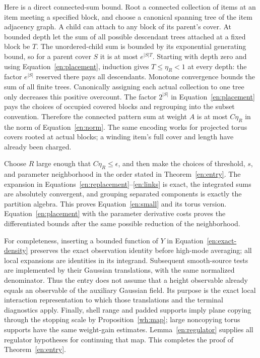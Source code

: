 Here is a direct connected-sum bound.  Root a connected collection
of items at an item meeting a specified block, and choose a canonical
spanning tree of the item adjacency graph.  A child can attach to any
block of its parent's cover.  At bounded depth let the sum of all
possible descendant trees attached at a fixed block be $T$.  The
unordered-child sum is bounded by its exponential generating bound,
so for a parent cover $S$ it is at most $e^{|S|T}$.  Starting with
depth zero and using Equation~\eqref{en:placement}, induction gives
$T\leq\eta_R<1$ at every depth: the factor $e^{|S|}$ reserved there
pays all descendants.  Monotone convergence bounds the sum of all
finite trees.  Canonically assigning each actual collection to one
tree only decreases this positive overcount.  The factor $2^{|S|}$
in Equation~\eqref{en:placement} pays the choices of occupied covered
blocks and regrouping into the subset convention.  Therefore the
connected pattern sum at weight $A$ is at most $C\eta_R$ in the norm
of Equation~\eqref{en:norm}.  The same encoding works for projected
torus covers rooted at actual blocks; a winding item's full cover and
length have already been charged.

Choose $R$ large enough that $C\eta_R\leq\epsilon$, and then make
the choices of threshold, $s$, and parameter neighborhood in the order
stated in Theorem~\ref{en:entry}.  The expansion in
Equations~\eqref{en:replacement}--\eqref{en:links} is exact, the
integrated sums are absolutely convergent, and grouping separated
components is exactly the partition algebra.  This proves
Equation~\eqref{en:small} and its torus version.  Equation~\eqref{en:placement}
with the parameter derivative costs proves the differentiated bounds
after the same possible reduction of the neighborhood.

For completeness, inserting a bounded function of $Y$ in
Equation~\eqref{en:exact-density} preserves the exact observation
identity before high-mode averaging; all local expansions are identities
in its integrand.  Subsequent smooth-source tests are implemented by
their Gaussian translations, with the same normalized denominator.
Thus the entry does not assume that a height observable already equals
an observable of the auxiliary Gaussian field.  Its purpose is the
exact local interaction representation to which those translations
and the terminal diagnostics apply.  Finally, shell range and padded
supports imply plane copying through the stopping scale by
Proposition~\ref{wh:map}; large noncopying torus supports have the same
weight-gain estimates.  Lemma~\ref{en:regulator} supplies all regulator
hypotheses for continuing that map.  This completes the proof of
Theorem~\ref{en:entry}.
